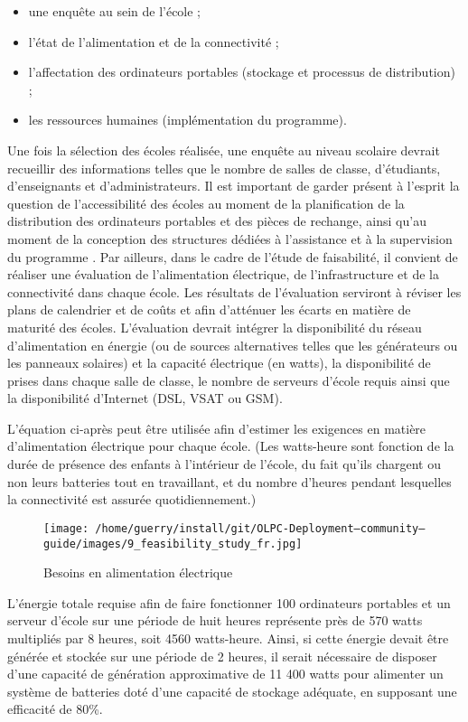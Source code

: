 \documentclass[12pt]{article}
\begin{document}
\begin{itemize}
\item une enquête au sein de l'école ;
\item l'état de l'alimentation et de la connectivité ;
\item l'affectation des ordinateurs portables (stockage et processus de
  distribution) ;
\item les ressources humaines (implémentation du programme).
\end{itemize}

Une fois la sélection des écoles réalisée, une enquête au niveau scolaire
devrait recueillir des informations telles que le nombre de salles de
classe, d'étudiants, d'enseignants et d'administrateurs. Il est important
de garder présent à l'esprit la question de l'accessibilité des écoles au
moment de la planification de la distribution des ordinateurs portables et
des pièces de rechange, ainsi qu'au moment de la conception des structures
dédiées à l'assistance et à la supervision du programme . Par ailleurs,
dans le cadre de l'étude de faisabilité, il convient de réaliser une
évaluation de l'alimentation électrique, de l'infrastructure et de la
connectivité dans chaque école. Les résultats de l'évaluation serviront à
réviser les plans de calendrier et de coûts et afin d'atténuer les écarts
en matière de maturité des écoles. L'évaluation devrait intégrer la
disponibilité du réseau d'alimentation en énergie (ou de sources
alternatives telles que les générateurs ou les panneaux solaires) et la
capacité électrique (en watts), la disponibilité de prises dans chaque
salle de classe, le nombre de serveurs d'école requis ainsi que la
disponibilité d'Internet (DSL, VSAT ou GSM).

L'équation ci-après peut être utilisée afin d'estimer les exigences en
matière d'alimentation électrique pour chaque école. (Les watts-heure sont
fonction de la durée de présence des enfants à l'intérieur de l'école, du
fait qu'ils chargent ou non leurs batteries tout en travaillant, et du
nombre d'heures pendant lesquelles la connectivité est assurée
quotidiennement.)

\begin{figure}[htb]
\centering
\texttt{[image: /home/guerry/install/git/OLPC-Deployment--community--guide/images/9\_feasibility\_study\_fr.jpg]}
\caption{Besoins en alimentation électrique}
\end{figure}

L'énergie totale requise afin de faire fonctionner 100 ordinateurs
portables et un serveur d'école sur une période de huit heures représente
près de 570 watts multipliés par 8 heures, soit 4560 watts-heure. Ainsi, si
cette énergie devait être générée et stockée sur une période de 2 heures,
il serait nécessaire de disposer d'une capacité de génération approximative
de 11 400 watts pour alimenter un système de batteries doté d'une capacité
de stockage adéquate, en supposant une efficacité de 80\%.
\end{document}
